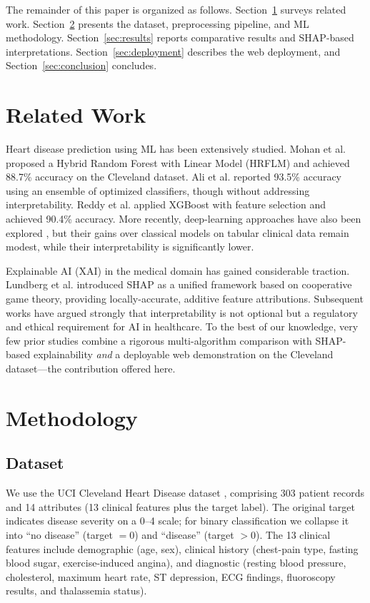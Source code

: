 \documentclass[conference]{IEEEtran}
\begin{document}
The remainder of this paper is organized as follows. Section~\ref{sec:related} surveys related work. Section~\ref{sec:method} presents the dataset, preprocessing pipeline, and ML methodology. Section~\ref{sec:results} reports comparative results and SHAP-based interpretations. Section~\ref{sec:deployment} describes the web deployment, and Section~\ref{sec:conclusion} concludes.

\section{Related Work}\label{sec:related}
Heart disease prediction using ML has been extensively studied. Mohan et al. \cite{mohan2019hrflm} proposed a Hybrid Random Forest with Linear Model (HRFLM) and achieved 88.7\% accuracy on the Cleveland dataset. Ali et al. \cite{ali2021ensemble} reported 93.5\% accuracy using an ensemble of optimized classifiers, though without addressing interpretability. Reddy et al. \cite{reddy2021xgboost} applied XGBoost with feature selection and achieved 90.4\% accuracy. More recently, deep-learning approaches have also been explored \cite{mienye2024deep}, but their gains over classical models on tabular clinical data remain modest, while their interpretability is significantly lower.

Explainable AI (XAI) in the medical domain has gained considerable traction. Lundberg et al. \cite{lundberg2017unified} introduced SHAP as a unified framework based on cooperative game theory, providing locally-accurate, additive feature attributions. Subsequent works \cite{rajpurkar2022aiclinical, tjoa2021survey} have argued strongly that interpretability is not optional but a regulatory and ethical requirement for AI in healthcare. To the best of our knowledge, very few prior studies combine a rigorous multi-algorithm comparison with SHAP-based explainability \emph{and} a deployable web demonstration on the Cleveland dataset---the contribution offered here.

\section{Methodology}\label{sec:method}

\subsection{Dataset}
We use the UCI Cleveland Heart Disease dataset \cite{detrano1989cleveland}, comprising 303 patient records and 14 attributes (13 clinical features plus the target label). The original target indicates disease severity on a 0--4 scale; for binary classification we collapse it into ``no disease'' (target $= 0$) and ``disease'' (target $> 0$). The 13 clinical features include demographic (age, sex), clinical history (chest-pain type, fasting blood sugar, exercise-induced angina), and diagnostic (resting blood pressure, cholesterol, maximum heart rate, ST depression, ECG findings, fluoroscopy results, and thalassemia status).
\end{document}
